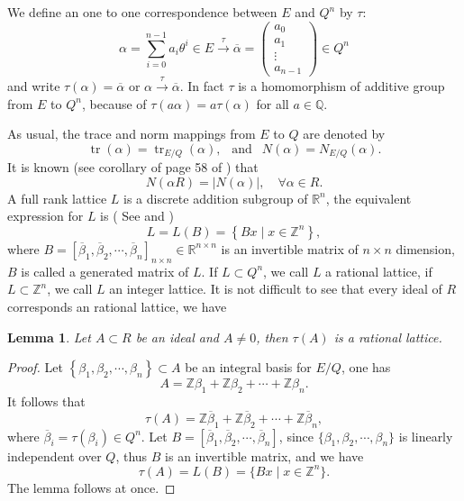 \documentclass [11pt]{article}
\newtheorem{lem}[thm]{\bf Lemma}
\begin{document}
We define an one to one correspondence between $E$ and $Q^{n}$ by $\tau$:
\begin{equation}\label{1.11}
\alpha=\sum_{i=0}^{n-1} a_{i} \theta^{i}  \in E \stackrel{\tau}{\longrightarrow}
\overline{\alpha}=\begin{pmatrix}
     a_0 \\
    a_1  \\
     \vdots \\
     a_{n-1}
\end{pmatrix}
\in Q^{n}
\end{equation}
and write $\tau(\alpha)=\overline{\alpha}$ or $\alpha \stackrel{\tau}{\rightarrow} \overline{\alpha}$. In fact $\tau$ is a  homomorphism of additive group from $E$ to $Q^{n}$, because of $\tau(a \alpha)=a \tau(\alpha)$ for all $a\in \mathbb{Q}.$

As usual, the trace and norm mappings from $E$ to $Q$ are denoted by
$$
\operatorname{tr}(\alpha)=\operatorname{tr}_{E/Q}(\alpha),\ \  \text { and } \ \ N(\alpha)=N_{E/Q}(\alpha).
$$
It  is known (see corollary of page 58 of  \cite{N}) that
\begin{equation}\label{1.12}
N(\alpha R)=|N(\alpha)|, \quad \forall \alpha \in R .
\end{equation}
A full rank  lattice $L$ is a discrete addition subgroup of $\mathbb{R}^{n}$, the equivalent expression for $L$ is   ( See \cite{M2} and \cite{Z})
\begin{equation}\label{1.13}
L=L(B)=\left\{B x \mid x \in \mathbb{Z}^{n}\right\} ,
\end{equation}
where $B=\left[\overline{\beta}_{1}, \overline{\beta}_{2}, \cdots, \overline{\beta}_{n}\right]_{n \times n} \in \mathbb{R}^{n \times n}$ is an invertible matrix of $n\times n$ dimension, $B$ is called a generated matrix of $L$. If $L \subset Q^{n}$, we call $L$  a rational lattice, if $L\subset \mathbb{Z}^{n}$, we call $L$  an integer lattice. It is not difficult to see that every ideal of $R$ corresponds an rational lattice, we have

\begin{lem}\label{lm1.2}
Let $A \subset R$ be an ideal and $A \neq 0$, then $\tau(A)$ is a rational lattice.

\end{lem}
\begin{proof} Let $\left\{\beta_{1}, \beta_{2},\cdots, \beta_{n}\right\} \subset A$ be an integral basis for $E/Q$,
one has
$$
A=\mathbb{Z} \beta_{1}+\mathbb{Z} \beta_{2}+\cdots+\mathbb{Z} \beta_{n}.
$$
It follows that
$$
\tau(A)=\mathbb{Z} \overline{\beta}_{1}+\mathbb{Z}\overline{ \beta}_{2}+\cdots+\mathbb{Z}\overline{ \beta}_{n},
$$
where $ \overline{\beta}_{i}= \tau ( \beta_{i}) \in Q^{n}$. Let $B=[\overline{\beta}_{1},\overline{\beta}_{2},\cdots,\overline{\beta}_{n} ]$, since $ \{ \beta_{1},\beta_{2},\cdots,\beta_{n}\}$  is linearly independent over $Q$, thus $B$ is an invertible matrix, and we have
$$
\tau(A)=L(B)=\{Bx \mid x\in \mathbb{Z}^{n}\}.
$$
The lemma follows at once.
\end{proof}
\end{document}
